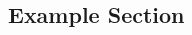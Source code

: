 

    \begin{multicols*}{4}

        \section{Example Section}

        \begin{topicbox}
            \blindtext
            \divider
            \blindtext
        \end{topicbox}

    \end{multicols*}
